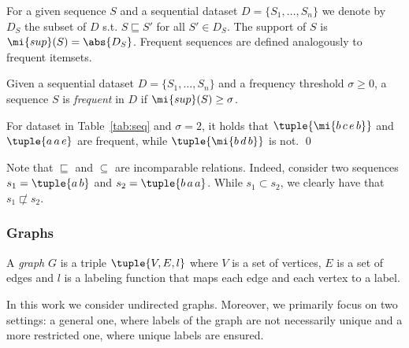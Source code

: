 For a given sequence $S$ and a sequential dataset $D=\{S_1,\dotsc,S_n\}$ we denote by $D_S$ the subset of $D$ s.t. $S \sqsubseteq S'$ for all $S' \in D_S$. The support of $S$ is $\mi{sup}(S)=\abs{D_S}$. Frequent sequences are defined analogously to frequent itemsets. 

\begin{definition}\label{def:frseq} Given a sequential dataset $D=\{S_1,\dotsc, S_n\}$ and a frequency threshold $\sigma \geq 0$, a sequence $S$ is \emph{frequent} in $D$ if $\mi{sup}(S)\geq \sigma$. %
\end{definition}

\begin{example}
	For  dataset in Table~\ref{tab:seq} and $\sigma=2$, it holds that $\tuple{\mi{b\,c\,e\,b}}$ and $\tuple{a\,a\,e}$ are frequent, while $\tuple{\mi{b\,d\,b}}$ is not. \qed
\end{example}

Note that $\sqsubseteq$ and $\subseteq$ are incomparable relations. Indeed, consider two sequences $s_1=\tuple{a\,b}$ and $s_2=\tuple{b\,a\,a}$. While $s_1\subset s_2$, we clearly have that $s_1 \not \sqsubset s_2$.

\subsubsection{Graphs} A \emph{graph} $G$ is a triple $\tuple{V, E, l}$ where $V$ is a set of vertices, $E$ is a set of edges and $l$ is a labeling function that maps each edge and each vertex to a label. 

In this work we consider undirected graphs. Moreover, we primarily focus on two settings: a general one, where labels of the graph are not necessarily unique and a more restricted one, where unique labels are ensured.


